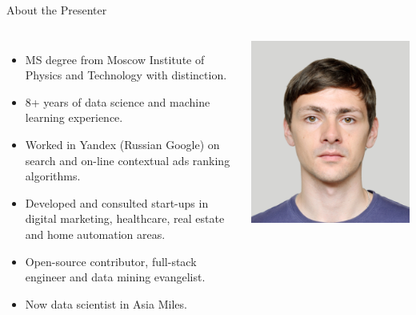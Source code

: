 \documentclass[unicode, notheorems]{beamer}
\begin{document}
\begin{frame}{About the Presenter}
\begin{columns}
  {\footnotesize 
    \begin{itemize}
    \item MS degree from Moscow Institute of Physics and Technology with distinction.
    \item 8+ years of data science and machine learning experience.
    \item Worked in Yandex (Russian Google) on search and on-line contextual ads ranking algorithms.
    \item Developed and consulted start-ups in digital marketing, healthcare, real estate and home automation areas.
    \item Open-source contributor, full-stack engineer and data mining evangelist.
    \item Now data scientist in Asia Miles.
    \end{itemize}
  }
	\includegraphics[scale=0.8]{images/author}
\end{columns}
\end{frame}
\end{document}
